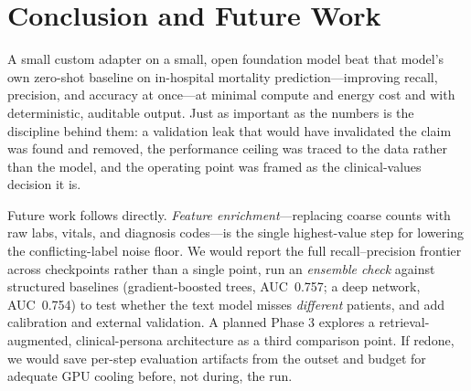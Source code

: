 \documentclass[sigconf,nonacm]{acmart}
\begin{document}
\section{Conclusion and Future Work}
A small custom adapter on a small, open foundation model beat that model's own
zero-shot baseline on in-hospital mortality prediction---improving recall,
precision, and accuracy at once---at minimal compute and energy cost and with
deterministic, auditable output. Just as important as the numbers is the
discipline behind them: a validation leak that would have invalidated the claim
was found and removed, the performance ceiling was traced to the data rather
than the model, and the operating point was framed as the clinical-values
decision it is.

Future work follows directly. \emph{Feature enrichment}---replacing coarse
counts with raw labs, vitals, and diagnosis codes---is the single highest-value
step for lowering the conflicting-label noise floor. We would report the full
recall--precision frontier across checkpoints rather than a single point, run an
\emph{ensemble check} against structured baselines (gradient-boosted trees,
AUC~0.757; a deep network, AUC~0.754) to test whether the text model misses
\emph{different} patients, and add calibration and external validation. A
planned Phase 3 explores a retrieval-augmented, clinical-persona architecture as
a third comparison point. If redone, we would save per-step evaluation
artifacts from the outset and budget for adequate GPU cooling before, not
during, the run.
\end{document}
